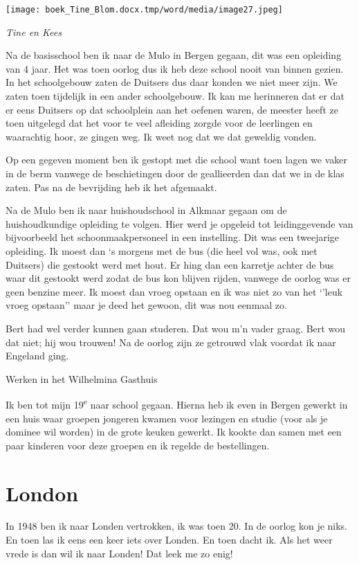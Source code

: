 \documentclass{scrbook}
\begin{document}
{\texttt{[image: boek\_Tine\_Blom.docx.tmp/word/media/image27.jpeg]}

\textit{Tine en Kees }



Na de basisschool ben ik naar de Mulo in Bergen gegaan, dit was een opleiding van 4 jaar. Het was toen oorlog dus ik heb deze school nooit van binnen gezien. In het schoolgebouw zaten de Duitsers dus daar konden we niet meer zijn. We zaten toen tijdelijk in een ander schoolgebouw. Ik kan me herinneren dat er dat er eens Duitsers op dat schoolplein aan het oefenen waren, de meester heeft ze toen uitgelegd dat het voor te veel afleiding zorgde voor de leerlingen en waarachtig hoor, ze gingen weg. Ik weet nog dat we dat geweldig vonden.

Op een gegeven moment ben ik gestopt met die school want toen lagen we vaker in de berm vanwege de beschietingen door de geallieerden dan dat we in de klas zaten. Pas na de bevrijding heb ik het afgemaakt.

Na de Mulo ben ik naar huishoudschool in Alkmaar gegaan om de huishoudkundige opleiding te volgen. Hier werd je opgeleid tot leidinggevende van bijvoorbeeld het schoonmaakpersoneel in een instelling. Dit was een tweejarige opleiding. Ik moest dan ‘s morgens met de bus (die heel vol was, ook met Duitsers) die gestookt werd met hout. Er hing dan een karretje achter de bus waar dit gestookt werd zodat de bus kon blijven rijden, vanwege de oorlog was er geen benzine meer. Ik moest dan vroeg opstaan en ik was niet zo van het ‘’leuk vroeg opstaan’’ maar je deed het gewoon, dit was nou eenmaal zo. 

Bert had wel verder kunnen gaan studeren. Dat wou m’n vader graag. Bert wou dat niet; hij wou trouwen! Na de oorlog zijn ze getrouwd vlak voordat ik naar Engeland ging.

Werken in het Wilhelmina Gasthuis

Ik ben tot mijn 19\textsuperscript{e} naar school gegaan. Hierna heb ik even in Bergen gewerkt in een huis waar groepen jongeren kwamen voor lezingen en studie (voor als je dominee wil worden) in de grote keuken gewerkt. Ik kookte dan samen met een paar kinderen voor deze groepen en ik regelde de bestellingen. 

\chapter{\label{ref-006}London}

In 1948 ben ik naar Londen vertrokken, ik was toen 20. In de oorlog kon je niks. En toen las ik eens een keer iets over Londen. En toen dacht ik. Als het weer vrede is dan wil ik naar Londen! Dat leek me zo enig! 

}
\end{document}
